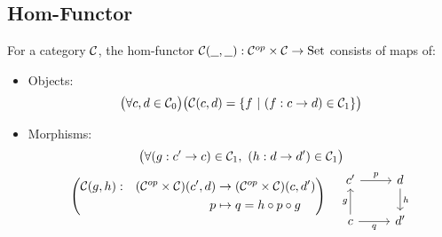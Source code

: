 \subsection{Hom-Functor}
\begin{definition}
  For a category $\mathcal{C}$, the hom-functor $\mathcal{C}(\underline{\ \ }, \underline{\ \ }) : \mathcal{C}^{op}\times \mathcal{C} \to
  \mathrm{Set}$ consists of maps of: \parencite{lane:working_mathematician}
  \begin{itemize}
    \item Objects:
      \[\big(\forall c, d \in \mathcal{C}_0\big)
        \big(\mathcal{C}(c, d) = \{f\ |\ (f: c \to d)\in \mathcal{C}_1\}\big)\]
    \item Morphisms:
      \[
        \begin{gathered}
          \big(\forall (g: c' \to c) \in \C_1,\ (h: d\to d')\in \C_1\big)\\
          \left(
            \begin{aligned}
              \C(g,h):&& (\C^{op}\times \C)(c', d) &\to
              (\C^{op}\times \C)(c, d')\\
              &&p &\mapsto q = h\circ p\circ g
            \end{aligned}
          \right)
          \quad
          \begin{tikzcd}
            {c'} & d \\
            c & {d'}
            \arrow["g", from=2-1, to=1-1]
            \arrow["h", from=1-2, to=2-2]
            \arrow["p", from=1-1, to=1-2]
            \arrow["q"', from=2-1, to=2-2]
            \end{tikzcd}
        \end{gathered}
      \]
  \end{itemize}
\end{definition}
